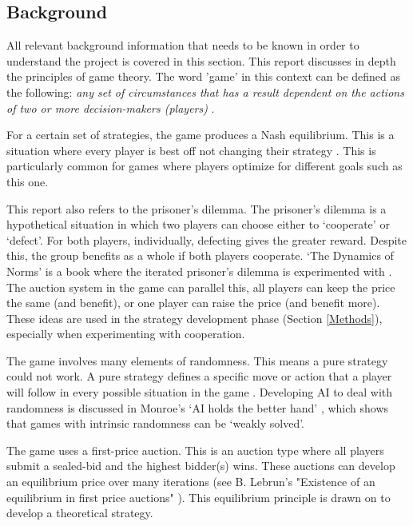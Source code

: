 \documentclass[11pt, twoside]{article}
\begin{document}
\subsection{Background}
All relevant background information that needs to be known in order to understand the project is covered in this section. This report discusses in depth the principles of game theory. The word 'game' in this context can be defined as the following: \textit{any set of circumstances that has a result dependent on the actions of two or more decision-makers (players)} \cite{myerson2013game}.

For a certain set of strategies, the game produces a Nash equilibrium. This is a situation where every player is best off not changing their strategy \cite{nash1951non}. This is particularly common for games where players optimize for different goals such as this one. 

This report also refers to the prisoner’s dilemma. The prisoner’s dilemma is a hypothetical situation in which two players can choose either to ‘cooperate’ or ‘defect’. For both players, individually, defecting gives the greater reward. Despite this, the group benefits as a whole if both players cooperate. ‘The Dynamics of Norms’ is a book where the iterated prisoner’s dilemma is experimented with \cite{bicchieri1997dynamics}. The auction system in the game can parallel this, all players can keep the price the same (and benefit), or one player can raise the price (and benefit more). These ideas are used in the strategy development phase (Section \ref{Methods}), especially when experimenting with cooperation.

The game involves many elements of randomness. This means a pure strategy could not work. A pure strategy defines a specific move or action that a player will follow in every possible situation in the game \cite{Strategy8:online}. Developing AI to deal with randomness is discussed in Monroe’s ‘AI holds the better hand’ \cite{monroe2018ai}, which shows that games with intrinsic randomness can be ‘weakly solved’.

The game uses a first-price auction. This is an auction type where all players submit a sealed-bid and the highest bidder(s) wins. These auctions can develop an equilibrium price over many iterations (see B. Lebrun's "Existence of an equilibrium in first price auctions" \cite{lebrun1996existence}). This equilibrium principle is drawn on to develop a theoretical strategy. 
\end{document}
